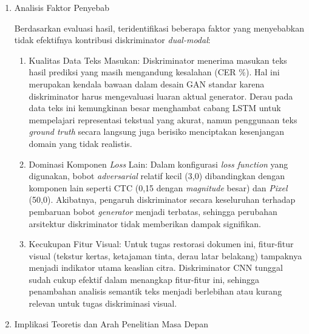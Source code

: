 \begin{enumerate}[leftmargin=1.5em, labelsep=0.5em, itemindent=0pt, noitemsep, topsep=0pt]
          Temuan ini menegaskan bahwa dalam konteks restorasi dokumen dengan karakteristik \textit{dataset} dan konfigurasi pelatihan yang digunakan, diskriminator visual (CNN) sudah memadai untuk membedakan citra asli dan hasil restorasi. Informasi tekstual yang diharapkan dapat membantu proses diskriminasi terbukti tidak memberikan dampak yang berarti pada hasil akhir.

    \item Analisis Faktor Penyebab

          Berdasarkan evaluasi hasil, teridentifikasi beberapa faktor yang menyebabkan tidak efektifnya kontribusi diskriminator \textit{dual-modal}:
          \begin{enumerate}[leftmargin=1.5em, labelsep=0.5em, itemindent=0pt, noitemsep, topsep=0pt, label=\alph*.]

              \item Kualitas Data Teks Masukan: Diskriminator menerima masukan teks hasil prediksi yang masih mengandung kesalahan (CER \%). Hal ini merupakan kendala bawaan dalam desain GAN standar karena diskriminator harus mengevaluasi luaran aktual generator. Derau pada data teks ini kemungkinan besar menghambat cabang LSTM untuk mempelajari representasi tekstual yang akurat, namun penggunaan teks \textit{ground truth} secara langsung juga berisiko menciptakan kesenjangan domain yang tidak realistis.

              \item Dominasi Komponen \textit{Loss} Lain: Dalam konfigurasi \textit{loss function} yang digunakan, bobot \textit{adversarial} relatif kecil (3,0) dibandingkan dengan komponen lain seperti CTC (0,15 dengan \textit{magnitude} besar) dan \textit{Pixel} (50,0). Akibatnya, pengaruh diskriminator secara keseluruhan terhadap pembaruan bobot \textit{generator} menjadi terbatas, sehingga perubahan arsitektur diskriminator tidak memberikan dampak signifikan.

              \item Kecukupan Fitur Visual: Untuk tugas restorasi dokumen ini, fitur-fitur visual (tekstur kertas, ketajaman tinta, derau latar belakang) tampaknya menjadi indikator utama keaslian citra. Diskriminator CNN tunggal sudah cukup efektif dalam menangkap fitur-fitur ini, sehingga penambahan analisis semantik teks menjadi berlebihan atau kurang relevan untuk tugas diskriminasi visual.
          \end{enumerate}

    \item Implikasi Teoretis dan Arah Penelitian Masa Depan


\end{enumerate}
